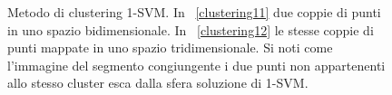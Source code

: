 \documentclass [11pt,a4paper,twoside,openright] {book}
\begin{document}
\begin{figure}[H]
        \centering%
        \qquad\qquad
          \caption{Metodo di clustering 1-SVM. In \figurename~\ref{clustering11} due coppie di punti in uno spazio bidimensionale. In \figurename~\ref{clustering12} le stesse coppie di punti mappate in uno spazio tridimensionale. Si noti come l'immagine del segmento congiungente i due punti non appartenenti allo stesso cluster esca dalla sfera soluzione di 1-SVM.}
\end{figure}
\end{document}
